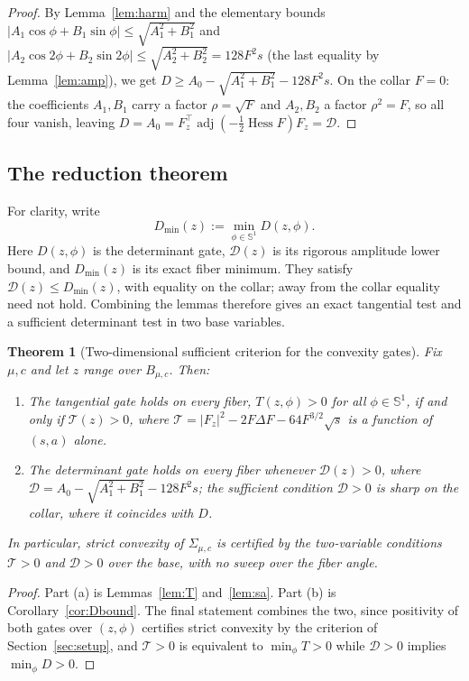 \documentclass[11pt,reqno]{amsart}
\theoremstyle{plain}
\newtheorem{theorem}{Theorem}[section]
\theoremstyle{definition}
\DeclareMathOperator{\adj}{adj}
\DeclareMathOperator{\Hess}{Hess}
\newcommand{\Sph}{\mathbb{S}}
\newcommand{\calT}{\mathcal{T}}
\newcommand{\calD}{\mathcal{D}}
\newcommand{\Fz}{F_{z}}
\begin{document}
\begin{proof}
By Lemma~\ref{lem:harm} and the elementary bounds $\lvert A_1\cos\phi+B_1\sin\phi\rvert\le\sqrt{A_1^2+B_1^2}$ and $\lvert A_2\cos2\phi+B_2\sin2\phi\rvert\le\sqrt{A_2^2+B_2^2}=128F^2s$ (the last equality by Lemma~\ref{lem:amp}), we get $D\ge A_0-\sqrt{A_1^2+B_1^2}-128F^2s$. On the collar $F=0$: the coefficients $A_1,B_1$ carry a factor $\rho=\sqrt{F}$ and $A_2,B_2$ a factor $\rho^2=F$, so all four vanish, leaving $D=A_0=\Fz^{\!\top}\adj(-\tfrac12\Hess F)\Fz=\calD$.
\end{proof}

\subsection{The reduction theorem}

For clarity, write
\[
D_{\min}(z):=\min_{\phi\in\Sph^1}D(z,\phi).
\]
Here $D(z,\phi)$ is the determinant gate, $\calD(z)$ is its rigorous amplitude lower bound, and $D_{\min}(z)$ is its exact fiber minimum. They satisfy $\calD(z)\le D_{\min}(z)$, with equality on the collar; away from the collar equality need not hold. Combining the lemmas therefore gives an exact tangential test and a sufficient determinant test in two base variables.

\begin{theorem}[Two-dimensional sufficient criterion for the convexity gates]\label{thm:reduction}
Fix $\mu,c$ and let $z$ range over $B_{\mu,c}$. Then:
\begin{enumerate}
\item[(a)] The tangential gate holds on every fiber, $T(z,\phi)>0$ for all $\phi\in\Sph^1$, if and only if $\calT(z)>0$, where $\calT=|\Fz|^2-2F\Delta F-64F^{3/2}\sqrt s$ is a function of $(s,a)$ alone.
\item[(b)] The determinant gate holds on every fiber whenever $\calD(z)>0$, where $\calD=A_0-\sqrt{A_1^2+B_1^2}-128F^2s$; the sufficient condition $\calD>0$ is sharp on the collar, where it coincides with $D$.
\end{enumerate}
In particular, strict convexity of $\Sigma_{\mu,c}$ is certified by the two-variable conditions $\calT>0$ and $\calD>0$ over the base, with no sweep over the fiber angle.
\end{theorem}

\begin{proof}
Part (a) is Lemmas~\ref{lem:T} and~\ref{lem:sa}. Part (b) is Corollary~\ref{cor:Dbound}. The final statement combines the two, since positivity of both gates over $(z,\phi)$ certifies strict convexity by the criterion of Section~\ref{sec:setup}, and $\calT>0$ is equivalent to $\min_\phi T>0$ while $\calD>0$ implies $\min_\phi D>0$.
\end{proof}
\end{document}
